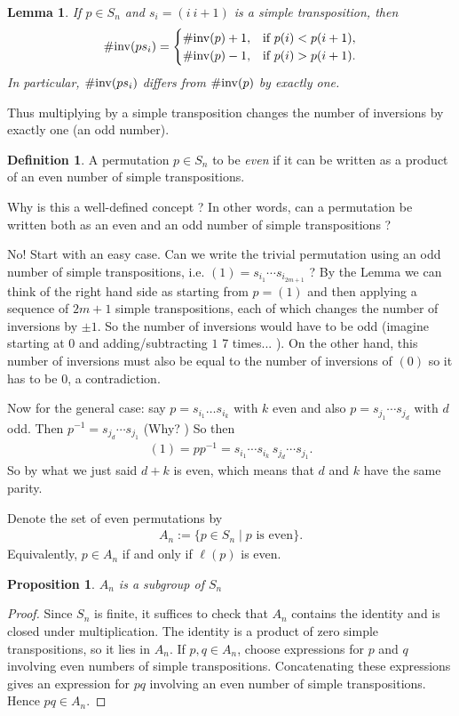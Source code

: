 \documentclass[reqno,11pt]{amsart}
\theoremstyle{definition}
\newtheorem{define}{Definition}[section]
\theoremstyle{plain}
\newtheorem{lemma}{Lemma}[section]
\newtheorem{proposition}{Proposition}[section]
\theoremstyle{remark}
\numberwithin{equation}{section}
\newcommand{\be}{\begin{eqnarray}}
\newcommand{\ee}{\end{eqnarray}}
\begin{document}
\begin{lemma}
	If $p\in S_n$ and $s_i=(i\ i+1)$ is a simple transposition, then
	\be
		\#\inv(ps_i)=
		\begin{cases}
			\#\inv(p)+1, & \text{if }p(i)<p(i+1),\\
			\#\inv(p)-1, & \text{if }p(i)>p(i+1).
		\end{cases}
		\ee
	In particular, $\#\mathrm{inv}(ps_i)$ differs from $\#\mathrm{inv}(p)$ by exactly one.
\end{lemma}

Thus multiplying by a simple transposition changes the number of inversions by exactly one (an odd number). 

\begin{define} A permutation $p \in S_n$ to be \textit{even} if it can be written as a product of an even number of simple transpositions. \end{define}

\begin{warning} 
Why is this a well-defined concept ? In other words, can a permutation be written both as an even and an odd number of simple transpositions ? \end{warning}

No! Start with an easy case. Can we write the trivial permutation using an odd number of simple transpositions, i.e. $(1) = s_{i_1} \cdots s_{i_{2m+1}}$ ? By the Lemma we can think of the right hand side as starting from $p=(1)$ and then applying a sequence of $2m+1$ simple transpositions, each of which changes the number of inversions by $\pm 1$. So the number of inversions would have to be odd (imagine starting at $0$ and adding/subtracting $1$ 7 times... ). On the other hand, this number of inversions must also be equal to the number of inversions of $(0)$ so it has to be $0$, a contradiction.  

Now for the general case: say $p = s_{i_1} \ldots s_{i_k}$ with $k$ even and also $p = s_{j_1} \cdots s_{j_d}$ with $d$ odd.  Then $p^{-1} = s_{j_d} \cdots s_{j_1}$ (Why? ) So then \be (1) = p p^{-1} = s_{i_1} \cdots s_{i_k} \, s_{j_d} \cdots s_{j_1}. \ee So by what we just said $d+k$ is even, which means that $d$ and $k$ have the same parity.
 
 
 Denote the set of even permutations by
\be
A_n := \{ p \in S_n \mid p \text{ is even} \}.
\ee
Equivalently, $p\in A_n$ if and only if $\ell(p)$ is even.

\begin{proposition} $A_n$ is a subgroup of $S_n$ \end{proposition}
\begin{proof} Since $S_n$ is finite, it suffices to check that $A_n$ contains the identity and is closed under multiplication. The identity is a product of zero simple transpositions, so it lies in $A_n$. If $p,q\in A_n$, choose expressions for $p$ and $q$ involving even numbers of simple transpositions. Concatenating these expressions gives an expression for $pq$ involving an even number of simple transpositions. Hence $pq\in A_n$. \end{proof}
\end{document}
